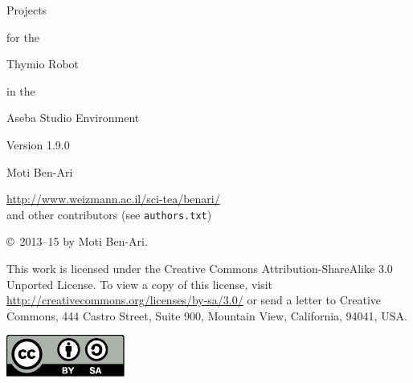 \thispagestyle{empty}

\begin{center}
\begin{bfseries}
\begin{LARGE}
Projects 

for the 

Thymio Robot

in the 

Aseba Studio Environment

\bigskip
\end{LARGE}

\begin{large}
Version 1.9.0
\end{large}

\begin{LARGE}
\bigskip\bigskip\bigskip\bigskip
Moti Ben-Ari
\end{LARGE}

\bigskip

\begin{large}
\href{http://www.weizmann.ac.il/sci-tea/benari/}{http://www.weizmann.ac.il/sci-tea/benari/}\\
\bigskip
and other contributors (see \texttt{authors.txt})
\end{large}
\end{bfseries}
\end{center}

\vfill

\begin{center}
\copyright{}\  2013--15 by Moti Ben-Ari. 
\end{center}

This work is licensed under the Creative Commons
Attribution-ShareAlike 3.0 Unported License. To view a copy
of this license, visit
\href{http://creativecommons.org/licenses/by-sa/3.0/}{http://creativecommons.org/licenses/by-sa/3.0/}
or send a letter to Creative Commons, 444 Castro Street, Suite 900,
Mountain View, California, 94041, USA.

\begin{center}
\includegraphics[width=.2\textwidth]{../images/by-sa}
\end{center}

\setlength{\parskip}{0\baselineskip plus 1pt minus 1pt}
\tableofcontents
\setlength{\parskip}{0.3\baselineskip plus 1pt minus 1pt}

\thispagestyle{empty}
\newpage
\setcounter{page}{1}
